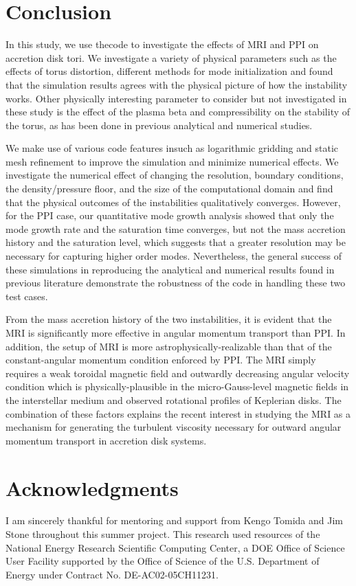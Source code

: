 \documentclass[iop,revtex4]{emulateapj}
\begin{document}
\section{Conclusion}
\par In this study, we use the\app code to investigate the effects of \acf{MRI} and \acf{PPI} on accretion disk tori. We investigate a variety of physical parameters such as the effects of torus distortion, different methods for mode initialization and found that the simulation results agrees with the physical picture of how the instability works. Other physically interesting parameter to consider but not investigated in these study is the effect of the plasma beta and compressibility on the stability of the torus, as has been done in previous analytical and numerical studies.
\par We make use of various code features in\app such as logarithmic gridding and static mesh refinement to improve the simulation and minimize numerical effects. We investigate the numerical  effect of changing the resolution, boundary conditions, the density/pressure floor, and the size of the computational domain and find that the physical outcomes of the instabilities qualitatively converges. However, for the \ac{PPI} case, our quantitative mode growth analysis showed that only the mode growth rate and the saturation time converges, but not the mass accretion history and the saturation level, which suggests that a greater resolution may be necessary for capturing higher order modes. Nevertheless, the general success of these simulations in reproducing the analytical and numerical results found in previous literature demonstrate the robustness of the \app code in handling these two test cases.
\par  From the mass accretion history of the two instabilities, it is evident that the \ac{MRI} is significantly more effective in angular momentum transport than \ac{PPI}. In addition, the setup of \ac{MRI} is more astrophysically-realizable than that of the constant-angular momentum condition enforced by \ac{PPI}. The \ac{MRI} simply requires a weak toroidal magnetic field and outwardly decreasing angular velocity condition which is physically-plausible in  the micro-Gauss-level magnetic fields in the interstellar medium and observed rotational profiles of Keplerian disks. The combination of these factors explains the recent interest in studying the \ac{MRI} as a mechanism for generating the turbulent viscosity necessary for outward angular momentum transport in accretion disk systems.
\acknowledgments
\section*{Acknowledgments}
I am sincerely thankful for mentoring and support from Kengo Tomida and Jim Stone throughout this summer project. This research used resources of the National Energy Research Scientific Computing Center, a DOE Office of Science User Facility supported by the Office of Science of the U.S. Department of Energy under Contract No. DE-AC02-05CH11231.

\end{document}
